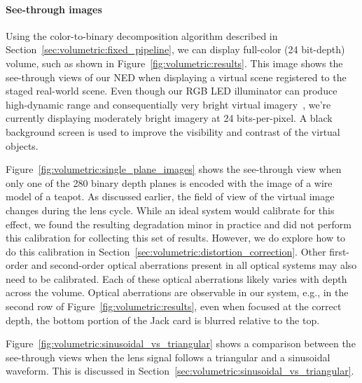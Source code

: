\paragraph{See-through images}


Using the color-to-binary decomposition algorithm described in Section~\ref{sec:volumetric:fixed_pipeline}, we can display full-color (24 bit-depth)  volume, such as shown in Figure~\ref{fig:volumetric:results}. This image shows the see-through views of our NED when displaying a virtual scene registered to the staged real-world scene. Even though our RGB LED illuminator can produce high-dynamic range and consequentially very bright virtual imagery~\cite{Lincoln2017scene}, we're currently displaying moderately bright imagery at 24 bits-per-pixel. A black background screen is used to improve the visibility and contrast of the virtual objects.

Figure~\ref{fig:volumetric:single_plane_images} shows the see-through view when only one of the 280 binary depth planes is encoded with the image of a wire model of a teapot.
As discussed earlier, the field of view of the virtual image changes during the lens cycle. While an ideal system would calibrate for this effect, we found the resulting degradation minor in practice and did not perform this calibration for collecting this set of results. However, we do explore how to do this calibration in Section~\ref{sec:volumetric:distortion_correction}. Other first-order and second-order optical aberrations present in all optical systems may also need to be calibrated. Each of these optical aberrations likely varies with depth across the volume. Optical aberrations are observable in our system, e.g., in the second row of Figure~\ref{fig:volumetric:results}, even when focused at the correct depth, the bottom portion of the Jack card is blurred relative to the top. 


Figure~\ref{fig:volumetric:sinusoidal_vs_triangular} shows a comparison between the see-through views when the lens signal follows a triangular and a sinusoidal waveform. This is discussed in Section~\ref{sec:volumetric:sinusoidal_vs_triangular}.




